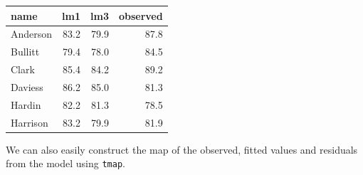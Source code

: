 \documentclass[
]{article}
\begin{document}
\captionsetup[table]{labelformat=empty,skip=1pt}
\begin{longtable}{lrrr}
\toprule
name & lm1 & lm3 & observed \\ 
\midrule
Anderson & 83.2 & 79.9 & 87.8 \\ 
Bullitt & 79.4 & 78.0 & 84.5 \\ 
Clark & 85.4 & 84.2 & 89.2 \\ 
Daviess & 86.2 & 85.0 & 81.3 \\ 
Hardin & 82.2 & 81.3 & 78.5 \\ 
Harrison & 83.2 & 79.9 & 81.9 \\ 
\bottomrule
\end{longtable}

We can also easily construct the map of the observed, fitted values and residuals from the model using \texttt{tmap}.
\end{document}
